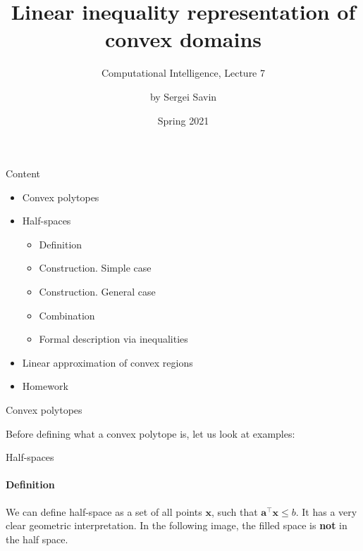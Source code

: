 \documentclass{beamer}
\title{Linear inequality representation of convex domains}
\subtitle{Computational Intelligence, Lecture 7}
\author{by Sergei Savin}
\date{Spring 2021}
\begin{document}
\maketitle


\begin{frame}{Content}

\begin{itemize}
\item Convex polytopes
\item Half-spaces
\begin{itemize}
\item Definition
\item Construction. Simple case
\item Construction. General case
\item Combination
\item Formal description via inequalities
\end{itemize}
\item Linear approximation of convex regions
\item Homework
\end{itemize}

\end{frame}



\begin{frame}{Convex polytopes}
\begin{flushleft}

Before defining what a convex polytope is, let us look at examples:


 
\end{flushleft}
\end{frame}



\begin{frame}{Half-spaces}
\framesubtitle{Definition}
\begin{flushleft}

We can define half-space as a set of all points $\mathbf{x}$, such that $\mathbf{a}^\top \mathbf{x} \leq b$. It has a very clear geometric interpretation. In the following image, the filled space is \textbf{not} in the half space.


 
\end{flushleft}
\end{frame}
\end{document}
